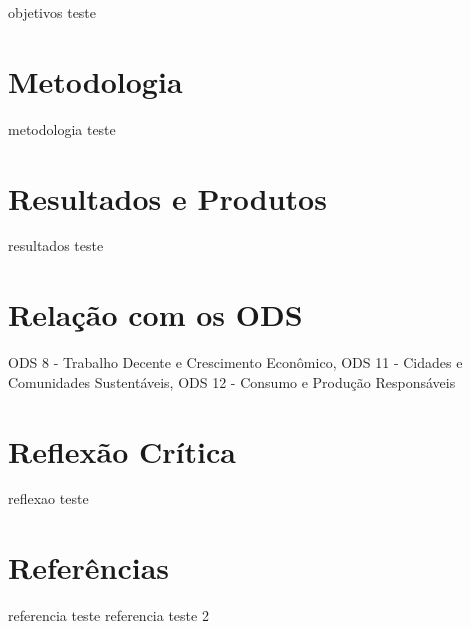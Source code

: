 \documentclass[12pt,a4paper]{article}
\begin{document}
objetivos teste


\section*{Metodologia}

metodologia teste


\section*{Resultados e Produtos}

resultados teste


\section*{Relação com os ODS}

ODS 8 - Trabalho Decente e Crescimento Econômico, ODS 11 - Cidades e Comunidades Sustentáveis, ODS 12 - Consumo e Produção Responsáveis


\section*{Reflexão Crítica }

reflexao teste


\section*{Referências}

referencia teste
referencia teste 2
\end{document}

